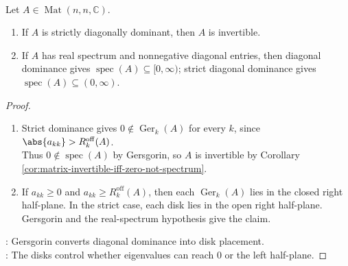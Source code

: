 \begin{corollary} \label{cor:strict-diagonal-dominance-invertible} \\
Let $A\in\operatorname{Mat}(n,n,\mathbb{C})$.
\begin{enumerate}[label=(\roman*)]
\setlength{\itemsep}{0pt}
\item If $A$ is strictly diagonally dominant, then $A$ is invertible.
\item If $A$ has real spectrum and nonnegative diagonal entries, then diagonal dominance gives $\operatorname{spec}(A)\subseteq[0,\infty)$; strict diagonal dominance gives $\operatorname{spec}(A)\subseteq(0,\infty)$.
\end{enumerate}
\begin{proof}
\begin{enumerate}[label=(\roman*)]
\setlength{\itemsep}{0pt}
\item Strict dominance gives $0\notin \operatorname{Ger}_k(A)$ for every $k$, since $\abs{a_{kk}}>R_k^{\mathrm{off}}(A)$.\\
Thus $0\notin\operatorname{spec}(A)$ by Gersgorin, so $A$ is invertible by Corollary \ref{cor:matrix-invertible-iff-zero-not-spectrum}.
\item If $a_{kk}\geq0$ and $a_{kk}\geq R_k^{\mathrm{off}}(A)$, then each $\operatorname{Ger}_k(A)$ lies in the closed right half-plane. In the strict case, each disk lies in the open right half-plane. Gersgorin and the real-spectrum hypothesis give the claim.
\end{enumerate}
: Gersgorin converts diagonal dominance into disk placement.\\
: The disks control whether eigenvalues can reach $0$ or the left half-plane.
\end{proof}
\end{corollary}

